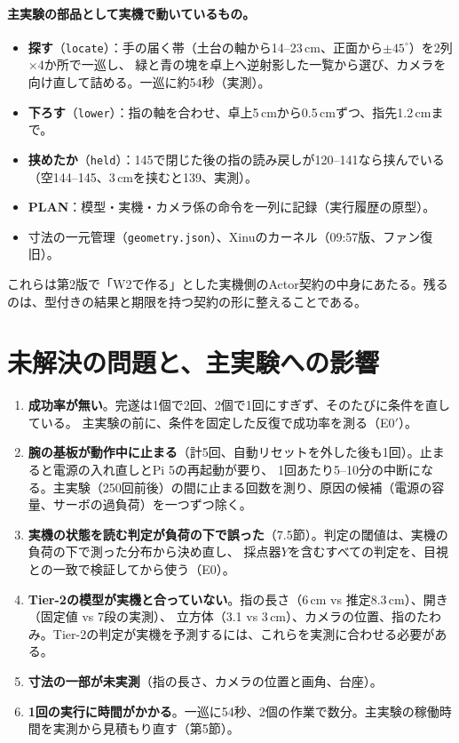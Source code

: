\documentclass[11pt,a4paper]{article}
\begin{document}
\paragraph{主実験の部品として実機で動いているもの。}
\begin{itemize}
\item \textbf{探す}（\texttt{locate}）：手の届く帯（土台の軸から14--23\,cm、正面から$\pm45^{\circ}$）を2列×4か所で一巡し、
緑と青の塊を卓上へ逆射影した一覧から選び、カメラを向け直して詰める。一巡に約54秒（実測）。
\item \textbf{下ろす}（\texttt{lower}）：指の軸を合わせ、卓上5\,cmから0.5\,cmずつ、指先1.2\,cmまで。
\item \textbf{挟めたか}（\texttt{held}）：145で閉じた後の指の読み戻しが120--141なら挟んでいる（空144--145、3\,cmを挟むと139、実測）。
\item \textbf{PLAN}：模型・実機・カメラ係の命令を一列に記録（実行履歴の原型）。
\item 寸法の一元管理（\texttt{geometry.json}）、Xinuのカーネル（09:57版、ファン復旧）。
\end{itemize}
\noindent これらは第2版で「W2で作る」とした実機側のActor契約の中身にあたる。残るのは、型付きの結果と期限を持つ契約の形に整えることである。

\section{未解決の問題と、主実験への影響}

\begin{enumerate}
\item \textbf{成功率が無い}。完遂は1個で2回、2個で1回にすぎず、そのたびに条件を直している。
主実験の前に、条件を固定した反復で成功率を測る（E0$'$）。
\item \textbf{腕の基板が動作中に止まる}（計5回、自動リセットを外した後も1回）。止まると電源の入れ直しとPi 5の再起動が要り、
1回あたり5--10分の中断になる。主実験（250回前後）の間に止まる回数を測り、原因の候補（電源の容量、サーボの過負荷）を一つずつ除く。
\item \textbf{実機の状態を読む判定が負荷の下で誤った}（7.5節）。判定の閾値は、実機の負荷の下で測った分布から決め直し、
採点器$Y$を含むすべての判定を、目視との一致で検証してから使う（E0）。
\item \textbf{Tier-2の模型が実機と合っていない}。指の長さ（6\,cm vs 推定8.3\,cm）、開き（固定値 vs 7段の実測）、
立方体（3.1 vs 3\,cm）、カメラの位置、指のたわみ。Tier-2の判定が実機を予測するには、これらを実測に合わせる必要がある。
\item \textbf{寸法の一部が未実測}（指の長さ、カメラの位置と画角、台座）。
\item \textbf{1回の実行に時間がかかる}。一巡に54秒、2個の作業で数分。主実験の稼働時間を実測から見積もり直す（第5節）。
\end{enumerate}
\end{document}
